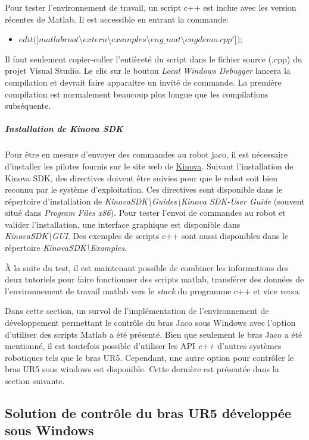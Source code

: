 Pour tester l'environnement de travail, un script c++ est inclue avec les version récentes de Matlab. 
Il est accessible en entrant la commande:
\begin{itemize}
\item $ edit([ matlabroot $\textbackslash$ extern$\textbackslash$ examples$\textbackslash$ eng\_mat$\textbackslash$ engdemo.cpp' ]);$
\end{itemize}

Il faut seulement copier-coller l'entièreté du script dans le fichier source (.cpp) du projet Visual Studio. Le clic sur le bouton \textit{Local Windows Debugger} lancera la compilation et devrait faire apparaitre un invité de commande. 
La première compilation est normalement beaucoup plus longue que les compilations subséquente.

\subparagraph{Installation de Kinova SDK}
Pour être en mesure d'envoyer des commandes au robot jaco, il est nécessaire d'installer les pilotes fournis sur le site web de \href{https://drive.google.com/open?id=0B790iVm0vRTlRFNFRldIb2Jmbkk}{Kinova}.
Suivant l'installation de Kinova SDK, des directives doivent être suivies pour que le robot soit bien reconnu par le système d'exploitation.
Ces directives sont disponible dans le répertoire d'installation de \textit{KinovaSDK\textbackslash Guides\textbackslash Kinova SDK-User Guide} (souvent situé dans \textit{Program Files x86}).
Pour tester l'envoi de commandes au robot et valider l'installation, une interface graphique est disponible dans \textit{KinovaSDK\textbackslash GUI}.
Des exemples de scripts c++ sont aussi disponibles dans le répertoire \textit{KinovaSDK\textbackslash Examples}.


À la suite du test, il est maintenant possible de combiner les informations des deux tutoriels pour faire fonctionner des scripts matlab, transférer des données de l'environnement de travail matlab vers le \textit{stack} du programme c++ et vice versa.

Dans cette section, un survol de l'implémentation de l'environnement de développement permettant le contrôle du bras Jaco sous Windows avec l'option d'utiliser des scripts Matlab a été présenté.
Bien que seulement le bras Jaco a été mentionné, il est toutefois possible d'utiliser les API \textit{c++} d'autres systèmes robotiques tels que le bras UR5. 
Cependant, une autre option pour contrôler le bras UR5 sous windows est disponible.
Cette dernière est présentée dans la section suivante.

\subsection{Solution de contrôle du bras UR5 développée sous Windows}












 